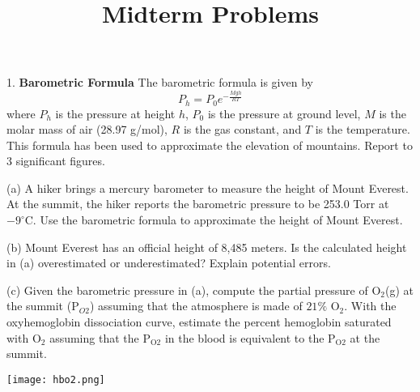 \documentclass[11pt]{article}
\title{\textbf{Midterm Problems}}
\begin{document}
\maketitle

1. \textbf{Barometric Formula} The barometric formula is given by
\begin{equation*}
  P_h = P_0 e^{-\frac{Mgh}{RT}}
\end{equation*}
where $P_h$ is the pressure at height $h$, $P_0$ is the pressure at ground level,
$M$ is the molar mass of air (28.97 g/mol), $R$ is the gas constant, and $T$ is the
temperature. This formula has been used to approximate the elevation of mountains.
Report to 3 significant figures.

(a) A hiker brings a mercury barometer to measure the height of Mount Everest. At the
summit, the hiker reports the barometric pressure to be 253.0 Torr at $-9^\circ\text{C}$.
Use the barometric formula to approximate the height of Mount Everest.


(b) Mount Everest has an official height of 8,485 meters. Is the calculated height in
(a) overestimated or underestimated? Explain potential errors.


(c) Given the barometric pressure in (a), compute the partial pressure of O$_2$(g) at the summit
(P$_{O2}$) assuming that the atmosphere is made of $21\%$ O$_2$. With the oxyhemoglobin dissociation
curve, estimate the percent hemoglobin saturated with O$_2$ assuming that the P$_{\text{O}2}$ in the blood
is equivalent to the P$_{\text{O}2}$ at the summit.


\begin{center}
  \texttt{[image: hbo2.png]}
\end{center}

%
%
%
%
%
\end{document}
